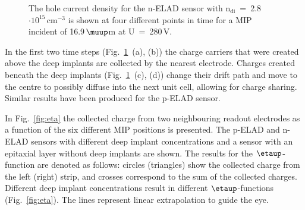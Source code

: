 \documentclass[a4paper,11pt]{article}
\begin{document}
\begin{figure}[h]
\begin{center}
\begin{minipage}[h]{0.17\linewidth}
\end{minipage}
\hfill 
\begin{minipage}[h]{0.17\linewidth}
\end{minipage}
\hfill 
\begin{minipage}[h]{0.1\linewidth}
\end{minipage}
\hfill 
\caption{The hole current density for the n-ELAD sensor with $\mathrm{n_{di}}$~=~2.8$\mathrm{\cdot10^{15}\,cm^{-3}}$ is shown at four different points in time for a MIP incident of 16.9\,$\muup$m at U~=~280\,V.}
\label{fig:tr}
\end{center}
\end{figure}
In the first two time steps (Fig.~\ref{fig:tr}~(a), (b)) the charge carriers that were created above the deep implants are collected by the nearest electrode.
Charges created beneath the deep implants (Fig.~\ref{fig:tr}~(c), (d)) change their drift path and move to the centre to possibly diffuse into the next unit cell, allowing for charge sharing.
Similar results have been produced for the p-ELAD sensor.

In Fig.~\ref{fig:eta} the collected charge from two neighbouring readout electrodes as a function of the six different MIP positions is presented.
The p-ELAD and n-ELAD sensors with different deep implant concentrations and a sensor with an epitaxial layer without deep implants are shown. 
The results for the $\etaup$-function are denoted as follows: circles (triangles) show the collected charge from the left (right) strip, and crosses correspond to the sum of the collected charges. 
Different deep implant concentrations result in different $\etaup$-functions (Fig.~\ref{fig:eta}).
The lines represent linear extrapolation to guide the eye.
\end{document}
